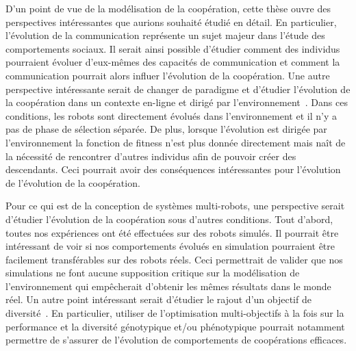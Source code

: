 		D'un point de vue de la modélisation de la coopération, cette thèse ouvre des perspectives intéressantes que aurions souhaité étudié en détail. En particulier, l'évolution de la communication représente un sujet majeur dans l'étude des comportements sociaux. Il serait ainsi possible d'étudier comment des individus pourraient évoluer d'eux-mêmes des capacités de communication et comment la communication pourrait alors influer l'évolution de la coopération. Une autre perspective intéressante serait de changer de paradigme et d'étudier l'évolution de la coopération dans un contexte en-ligne et dirigé par l'environnement~\parencite{Montanier2011, Montanier2013}. Dans ces conditions, les robots sont directement évolués dans l'environnement et il n'y a pas de phase de sélection séparée. De plus, lorsque l'évolution est dirigée par l'environnement la fonction de fitness n'est plus donnée directement mais naît de la nécessité de rencontrer d'autres individus afin de pouvoir créer des descendants. Ceci pourrait avoir des conséquences intéressantes pour l'évolution de l'évolution de la coopération.

		Pour ce qui est de la conception de systèmes multi-robots, une perspective serait d'étudier l'évolution de la coopération sous d'autres conditions. Tout d'abord, toutes nos expériences ont été effectuées sur des robots simulés. Il pourrait être intéressant de voir si nos comportements évolués en simulation pourraient être facilement transférables sur des robots réels. Ceci permettrait de valider que nos simulations ne font aucune supposition critique sur la modélisation de l'environnement qui empêcherait d'obtenir les mêmes résultats dans le monde réel. Un autre point intéressant serait d'étudier le rajout d'un objectif de diversité~\parencite{Lehman2008, Doncieux2014a}. En particulier, utiliser de l'optimisation multi-objectifs à la fois sur la performance et la diversité génotypique et/ou phénotypique pourrait notamment permettre de s'assurer de l'évolution de comportements de coopérations efficaces.